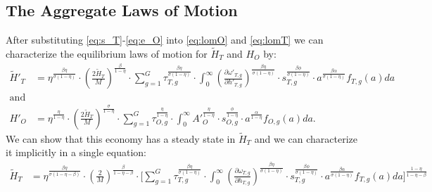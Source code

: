 \documentclass[onehalfspacing,11pt]{article}
\newtheorem{prp}{Proposition}
\begin{document}
		
		\subsection{The Aggregate Laws of Motion}
		After substituting \eqref{eq:s_T}-\eqref{eq:e_O} into \eqref{eq:lomO} and \eqref{eq:lomT} we can characterize the equilibrium laws of motion for $\widetilde{H}_{T}$ and ${H}_{O}$ by:%
		\begin{align}
			\widetilde{H}'_{T} & =\eta^{\frac{\beta\eta}{\sigma(1-\eta)}} \cdot \left(\tfrac{2\widetilde{H}_T}{M}\right)^{\frac{\beta}{1-\eta}} \cdot \sum_{g=1}^G \tau_{T,g}^\frac{\beta\eta}{\sigma(1-\eta)} \cdot \int_0^\infty \left( \tfrac{\partial \omega'_{T,g}}{\partial h'_{T,g}} \right)^\frac{\beta\eta}{\sigma(1-\eta)} \cdot s_{T,g}^\frac{\beta\phi}{\sigma(1-\eta)} \cdot a^\frac{\beta\alpha}{\sigma(1-\eta)}  f_{T,g}(a)da\\
			\textrm{and} \nonumber\\
			{H}'_{O} & = \eta^\frac{\eta}{1-\eta} \cdot \left(\tfrac{2\widetilde{H}_T}{M}\right)^\frac{\sigma}{1-\eta}\cdot \sum_{g=1}^G \tau_{O,g}^\frac{\eta}{1-\eta} \cdot \int_0^\infty {A'}_O^\frac{\eta}{1-\eta} \cdot s_{O,g}^\frac{\phi}{1-\eta} \cdot a^{\frac{\alpha}{1-\eta}} f_{O,g}(a)da.
		\end{align}
		We can show that this economy has a steady state in $\widetilde{H}_T$ and we can characterize it implicitly in a single equation:%
		\begin{align}
			\widetilde{H}_{T} & = \eta^{\frac{\beta\eta}{\sigma(1-\eta-\beta)}} \cdot \left(\tfrac{2}{M}\right)^{\frac{\beta}{1-\eta-\beta}} \cdot \Bigg[ \sum_{g=1}^G \tau_{T,g}^\frac{\beta\eta}{\sigma(1-\eta)} \cdot \int_0^\infty \left( \tfrac{\partial \omega_{T,g}}{\partial h_{T,g}} \right)^\frac{\beta\eta}{\sigma(1-\eta)} \cdot s_{T,g}^\frac{\beta\phi}{\sigma(1-\eta)} \cdot a^\frac{\beta\alpha}{\sigma(1-\eta)}  f_{T,g}(a)da \Bigg]^\frac{1-\eta}{1-\eta-\beta}
		\end{align}
		
\end{document}
